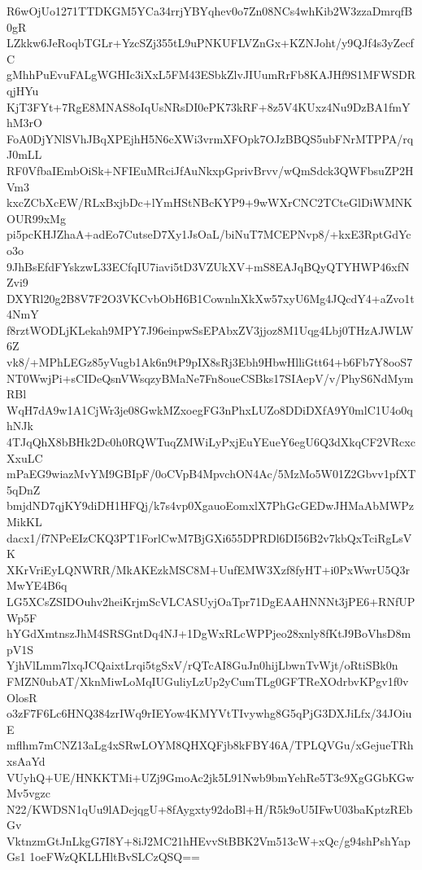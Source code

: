 R6wOjUo1271TTDKGM5YCa34rrjYBYqhev0o7Zn08NCs4whKib2W3zzaDmrqfB0gR
LZkkw6JeRoqbTGLr+YzcSZj355tL9uPNKUFLVZnGx+KZNJoht/y9QJf4s3yZecfC
gMhhPuEvuFALgWGHIc3iXxL5FM43ESbkZlvJIUumRrFb8KAJHf9S1MFWSDRqjHYu
KjT3FYt+7RgE8MNAS8oIqUsNRsDI0ePK73kRF+8z5V4KUxz4Nu9DzBA1fmYhM3rO
FoA0DjYNlSVhJBqXPEjhH5N6cXWi3vrmXFOpk7OJzBBQS5ubFNrMTPPA/rqJ0mLL
RF0VfbaIEmbOiSk+NFIEuMRciJfAuNkxpGprivBrvv/wQmSdck3QWFbsuZP2HVm3
kxcZCbXcEW/RLxBxjbDc+lYmHStNBcKYP9+9wWXrCNC2TCteGlDiWMNKOUR99xMg
pi5pcKHJZhaA+adEo7CutseD7Xy1JsOaL/biNuT7MCEPNvp8/+kxE3RptGdYco3o
9JhBsEfdFYskzwL33ECfqIU7iavi5tD3VZUkXV+mS8EAJqBQyQTYHWP46xfNZvi9
DXYRl20g2B8V7F2O3VKCvbObH6B1CownlnXkXw57xyU6Mg4JQcdY4+aZvo1t4NmY
f8rztWODLjKLekah9MPY7J96einpwSsEPAbxZV3jjoz8M1Uqg4Lbj0THzAJWLW6Z
vk8/+MPhLEGz85yVugb1Ak6n9tP9pIX8sRj3Ebh9HbwHlliGtt64+b6Fb7Y8ooS7
NT0WwjPi+sCIDeQsnVWsqzyBMaNe7Fn8oueCSBks17SIAepV/v/PhyS6NdMymRBl
WqH7dA9w1A1CjWr3je08GwkMZxoegFG3nPhxLUZo8DDiDXfA9Y0mlC1U4o0qhNJk
4TJqQhX8bBHk2Dc0h0RQWTuqZMWiLyPxjEuYEueY6egU6Q3dXkqCF2VRcxcXxuLC
mPaEG9wiazMvYM9GBIpF/0oCVpB4MpvchON4Ac/5MzMo5W01Z2Gbvv1pfXT5qDnZ
bmjdND7qjKY9diDH1HFQj/k7s4vp0XgauoEomxlX7PhGcGEDwJHMaAbMWPzMikKL
dacx1/f7NPeEIzCKQ3PT1ForlCwM7BjGXi655DPRDl6DI56B2v7kbQxTciRgLsVK
XKrVriEyLQNWRR/MkAKEzkMSC8M+UufEMW3Xzf8fyHT+i0PxWwrU5Q3rMwYE4B6q
LG5XCsZSIDOuhv2heiKrjmScVLCASUyjOaTpr71DgEAAHNNNt3jPE6+RNfUPWp5F
hYGdXmtnszJhM4SRSGntDq4NJ+1DgWxRLcWPPjeo28xnly8fKtJ9BoVhsD8mpV1S
YjhVlLmm7lxqJCQaixtLrqi5tgSxV/rQTcAI8GuJn0hijLbwnTvWjt/oRtiSBk0n
FMZN0ubAT/XknMiwLoMqIUGuliyLzUp2yCumTLg0GFTReXOdrbvKPgv1f0vOlosR
o3zF7F6Lc6HNQ384zrIWq9rIEYow4KMYVtTIvywhg8G5qPjG3DXJiLfx/34JOiuE
mflhm7mCNZ13aLg4xSRwLOYM8QHXQFjb8kFBY46A/TPLQVGu/xGejueTRhxsAaYd
VUyhQ+UE/HNKKTMi+UZj9GmoAc2jk5L91Nwb9bmYehRe5T3c9XgGGbKGwMv5vgzc
N22/KWDSN1qUu9lADejqgU+8fAygxty92doBl+H/R5k9oU5IFwU03baKptzREbGv
VktnzmGtJnLkgG7I8Y+8iJ2MC21hHEvvStBBK2Vm513cW+xQc/g94shPshYapGs1
1oeFWzQKLLHltBvSLCzQSQ==
